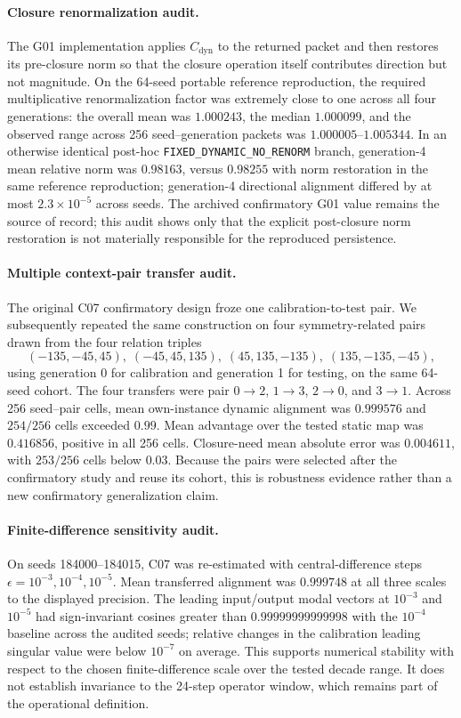 \documentclass[11pt]{article}
\begin{document}
\paragraph{Closure renormalization audit.}
The G01 implementation applies $C_{\mathrm{dyn}}$ to the returned packet and then restores its pre-closure norm so that the closure operation itself contributes direction but not magnitude. On the 64-seed portable reference reproduction, the required multiplicative renormalization factor was extremely close to one across all four generations: the overall mean was $1.000243$, the median $1.000099$, and the observed range across 256 seed--generation packets was $1.000005$--$1.005344$. In an otherwise identical post-hoc \texttt{FIXED\_DYNAMIC\_NO\_RENORM} branch, generation-4 mean relative norm was $0.98163$, versus $0.98255$ with norm restoration in the same reference reproduction; generation-4 directional alignment differed by at most $2.3\times10^{-5}$ across seeds. The archived confirmatory G01 value remains the source of record; this audit shows only that the explicit post-closure norm restoration is not materially responsible for the reproduced persistence.

\paragraph{Multiple context-pair transfer audit.}
The original C07 confirmatory design froze one calibration-to-test pair. We subsequently repeated the same construction on four symmetry-related pairs drawn from the four relation triples
\[
(-135,-45,45),\;(-45,45,135),\;(45,135,-135),\;(135,-135,-45),
\]
using generation 0 for calibration and generation 1 for testing, on the same 64-seed cohort. The four transfers were pair $0\!\to\!2$, $1\!\to\!3$, $2\!\to\!0$, and $3\!\to\!1$. Across 256 seed--pair cells, mean own-instance dynamic alignment was $0.999576$ and $254/256$ cells exceeded $0.99$. Mean advantage over the tested static map was $0.416856$, positive in all 256 cells. Closure-need mean absolute error was $0.004611$, with $253/256$ cells below $0.03$. Because the pairs were selected after the confirmatory study and reuse its cohort, this is robustness evidence rather than a new confirmatory generalization claim.

\paragraph{Finite-difference sensitivity audit.}
On seeds 184000--184015, C07 was re-estimated with central-difference steps $\epsilon=10^{-3},10^{-4},10^{-5}$. Mean transferred alignment was $0.999748$ at all three scales to the displayed precision. The leading input/output modal vectors at $10^{-3}$ and $10^{-5}$ had sign-invariant cosines greater than $0.99999999999998$ with the $10^{-4}$ baseline across the audited seeds; relative changes in the calibration leading singular value were below $10^{-7}$ on average. This supports numerical stability with respect to the chosen finite-difference scale over the tested decade range. It does not establish invariance to the 24-step operator window, which remains part of the operational definition.
\end{document}
